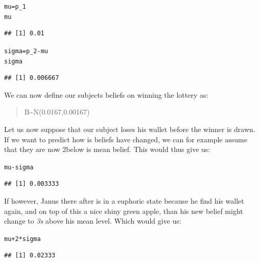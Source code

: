 \documentclass[a4paper]{book}\usepackage{graphicx, color}
\makeatletter
\newenvironment{kframe}{%
 \def\at@end@of@kframe{}%
 \ifinner\ifhmode%
  \def\at@end@of@kframe{\end{minipage}}%
  \begin{minipage}{\columnwidth}%
 \fi\fi%
 \def\FrameCommand##1{\hskip\@totalleftmargin \hskip-\fboxsep
 \colorbox{shadecolor}{##1}\hskip-\fboxsep
     \hskip-\linewidth \hskip-\@totalleftmargin \hskip\columnwidth}%
 \MakeFramed {\advance\hsize-\width
   \@totalleftmargin\z@ \linewidth\hsize
   \@setminipage}}%
 {\par\unskip\endMakeFramed%
 \at@end@of@kframe}
\newenvironment{knitrout}{}{} %
\makeatother
\begin{document}
\begin{knitrout}
\color{fgcolor}\begin{kframe}
\begin{alltt}
mu = p_1
mu
\end{alltt}
\begin{verbatim}
## [1] 0.01
\end{verbatim}
\end{kframe}
\end{knitrout}


\begin{knitrout}
\color{fgcolor}\begin{kframe}
\begin{alltt}
sigma = p_2 - mu
sigma
\end{alltt}
\begin{verbatim}
## [1] 0.006667
\end{verbatim}
\end{kframe}
\end{knitrout}


We can now define our subjects beliefs on winning the lottery as:

\begin{quote}
B\textasciitilde{}N(0.0167,0.00167)
\end{quote}

Let us now suppose that our subject loses his wallet before the winner
is drawn. If we want to predict how is beliefs have changed, we can for
example assume that they are now 2below is mean belief. This would thus
give us:

\begin{knitrout}
\color{fgcolor}\begin{kframe}
\begin{alltt}
mu - sigma
\end{alltt}
\begin{verbatim}
## [1] 0.003333
\end{verbatim}
\end{kframe}
\end{knitrout}


If however, Janus there after is in a euphoric state because he find his
wallet again, and on top of this a nice shiny green apple, than his new
belief might change to \emph{3s} above his mean level. Which would give
us:

\begin{knitrout}
\color{fgcolor}\begin{kframe}
\begin{alltt}
mu + 2 * sigma
\end{alltt}
\begin{verbatim}
## [1] 0.02333
\end{verbatim}
\end{kframe}
\end{knitrout}
\end{document}
